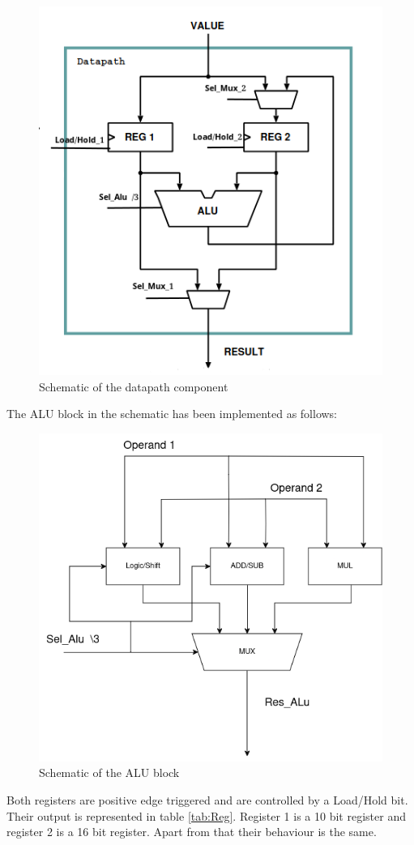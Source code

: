 \documentclass[12pt]{article}
\begin{document}
\begin{figure}[H]
	\centering
	\includegraphics[width=0.6\linewidth]{Imagens/datapath.png}
	\caption{Schematic of the datapath component}
	\label{fig:datapath}
\end{figure}

The ALU block in the schematic has been implemented as follows:

\begin{figure}[H]
	\centering
	\includegraphics[width=0.8\linewidth]{Imagens/ALU.png}
	\caption{Schematic of the ALU block}
	\label{fig:ALU}
\end{figure}

Both registers are positive edge triggered and are controlled by a Load/Hold bit. Their output is represented in table \ref{tab:Reg}. Register 1 is a 10 bit register and register 2 is a 16 bit register. Apart from that their behaviour is the same.
\end{document}
